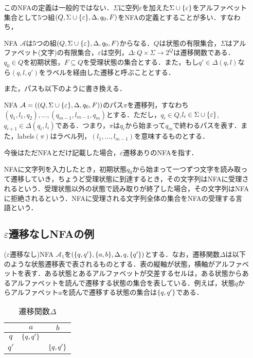 \documentclass[a4paper, 12pt, dvipdfmx, uplatex]{jsreport}
\begin{document}
このNFAの定義は一般的ではない．$\Sigma$に空列$\varepsilon$を加えた$\Sigma \cup \qty{\varepsilon}$をアルファベット集合として5つ組$(Q,\Sigma \cup \qty{\varepsilon},\Delta,q_0,F)$をNFAの定義とすることが多い．すなわち，

\begin{dfn}[NFA]
  NFA $\mathcal{A}$は5つの組$(Q,\Sigma \cup \qty{\varepsilon},\Delta,q_0,F)$からなる．$Q$は状態の有限集合，$\Sigma$はアルファベット(文字)の有限集合，$\varepsilon$は空列，$\Delta :Q\times \Sigma \rightarrow 2^Q$は遷移関数である．$q_0 \in Q$を初期状態，$F \subseteq Q$を受理状態の集合とする．また，もし$q'\in \Delta (q,l)$なら$(q,l,q')$をラベルを経由した遷移と呼ぶこととする．
\end{dfn}

また，パスも以下のように書き換える．
\begin{dfn}[パス]
  NFA $\mathcal{A}=((Q,\Sigma \cup \qty{\varepsilon},\Delta,q_0,F))$のパス$\pi$を遷移列，すなわち$(q_1,l_1,q_2),\ldots,(q_{m-1},l_{m-1},q_{m})$とする．ただし，$q_i \in Q$,$l_i \in \Sigma \cup \qty{\varepsilon}$,$q_{i+1} \in \Delta(q_i,l_i)$である．つまり，$\pi$は$q_i$から始まって$q_m$で終わるパスを表す．また，labels$(\pi)$はラベル列，$(l_1,\ldots ,l_{m-1})$を意味するものとする．
\end{dfn}


今後はただNFAとだけ記載した場合，$\varepsilon$遷移ありのNFAを指す．

NFAに文字列を入力したとき，初期状態$q_0$から始まって一つずつ文字を読み取って遷移していき，ちょうど受理状態に到達するとき，その文字列はNFAに受理されるという．受理状態以外の状態で読み取りが終了した場合，その文字列はNFAに拒絶されるという．NFAに受理される文字列全体の集合をNFAの受理する言語という．



\subsection{$\varepsilon$遷移なしNFAの例}
($\varepsilon$遷移なし)NFA $\mathcal{A}_1$を$(\qty{q,q'},\qty{a,b},\Delta,q,\qty{q'})$とする．なお，遷移関数$\Delta$は以下のような状態遷移表で表されるものとする．表の縦軸が状態，横軸がアルファベットを表す．ある状態とあるアルファベットが交差するセルは，ある状態からあるアルファベットを読んで遷移する状態の集合を表している．例えば，状態$q$からアルファベット$a$を読んで遷移する状態の集合は$\qty{q,q'}$である．

\begin{table}[H]
  \centering
  \caption{遷移関数$\Delta$\label{delta}}
  \begin{tabular}{c|c|c} \hline \hline
       & $a$  &$b$ \\\hline
    $q$  & $\qty{q,q'}$ &$\qty{}$ \\\hline
    $q'$ & $\qty{}$  &$\qty{q,q'}$ \\\hline
  \end{tabular}
\end{table}
\end{document}
